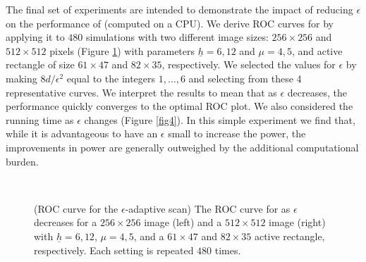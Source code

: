 \documentclass[twoside,11pt]{article}
\begin{document}
The final set of experiments are intended to demonstrate the impact of reducing $\epsilon$ on the performance of  (computed on a CPU).
We derive ROC curves for  by applying it to $480$ simulations with two different image sizes: $256 \times 256$ and $512 \times 512$ pixels (Figure \ref{fig3}) with parameters $\underline h = 6,12$ and $\mu = 4,5$, and active rectangle of size $61 \times 47$ and $82 \times 35$, respectively.  
We selected the values for $\epsilon$ by making $8d / \epsilon^2$ equal to the integers $1, \ldots, 6$ and selecting from these 4 representative curves.
We interpret the results to mean that as $\epsilon$ decreases, the performance quickly converges to the optimal ROC plot.
We also considered the running time as $\epsilon$ changes (Figure \ref{fig4}).
In this simple experiment we find that, while it is advantageous to have an $\epsilon$ small to increase the power, the improvements in power are generally outweighed by the additional computational burden.

\begin{figure}[!htbp]
\centering
\mbox{
}
\caption{\small{(ROC curve for the $\epsilon$-adaptive scan) The ROC curve for  as $\epsilon$ decreases for a $256 \times 256$ image (left) and a $512 \times 512$ image (right) with $\underline h = 6, 12$, $\mu = 4,5$, and a $61 \times 47$ and $82 \times 35$ active rectangle, respectively.  Each setting is repeated $480$ times.}
}
\label{fig3}
\end{figure}
\end{document}
